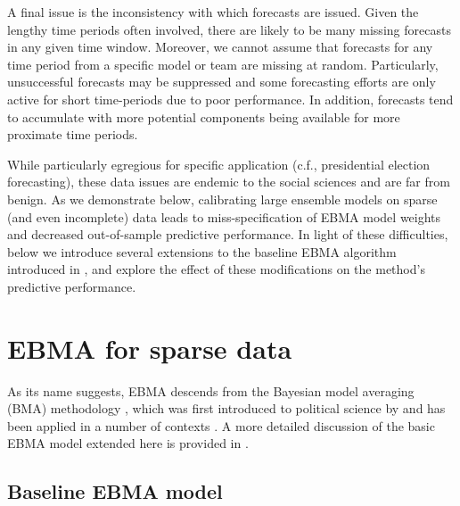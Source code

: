 \documentclass[12pt,fullpage,endnotes]{article}
\begin{document}
A final issue is the inconsistency with which forecasts are
issued. Given the lengthy time periods often involved, there are
likely to be many missing forecasts in any given time window.
Moreover, we cannot assume that forecasts for any time period from a
specific model or team are missing at random.  Particularly,
unsuccessful forecasts may be suppressed and some forecasting efforts
are only active for short time-periods due to poor performance.
In addition, forecasts tend to accumulate with more potential
components being available for more proximate time periods.

While particularly egregious for specific application (c.f.,
presidential election forecasting), these data issues are endemic to
the social sciences and are far from benign. As we demonstrate below,
calibrating large ensemble models on sparse (and even incomplete) data
leads to miss-specification of EBMA model weights and decreased
out-of-sample predictive performance. In light of these difficulties,
below we introduce several extensions to the baseline EBMA algorithm
introduced in
,
and explore the effect of these modifications on the method's
predictive performance.

\section{EBMA for sparse data} 
\label{model}


As its name suggests, EBMA descends from the Bayesian model averaging
(BMA) methodology \citep[c.f.,][]{Madigan:1994, Raftery:1995,
  Hoeting:1999, Clyde:2003, Clyde:2004}, which was first introduced to
political science by \citet{Bartels:1997} and has been applied in a
number of contexts \citep[e.g.,][]{Bartels:2001, Gill:2004, Imai:2004,
  Montgomery:2010}. A more detailed discussion of the basic EBMA
model extended here is provided in
.

\subsection{Baseline EBMA model}
\end{document}
